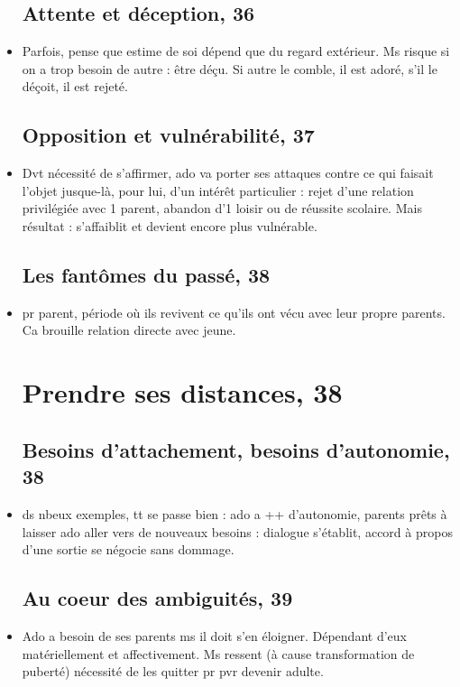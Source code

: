 \documentclass[12pt]{report}
\begin{document}
\begin{itemize}
\subsection{Attente et déception, 36}

\item Parfois, pense que estime de soi dépend que du regard extérieur. Ms risque si on a trop besoin de autre : être déçu. Si autre le comble, il est adoré, s'il le déçoit, il est rejeté.

\subsection{Opposition et vulnérabilité, 37}

\item Dvt nécessité de s'affirmer, ado va porter ses attaques contre ce qui faisait l'objet jusque-là, pour lui, d'un intérêt particulier : rejet d'une relation privilégiée avec 1 parent, abandon d'1 loisir ou de réussite scolaire. Mais résultat : s'affaiblit et devient encore plus vulnérable.

\subsection{Les fantômes du passé, 38}

\item pr parent, période où ils revivent ce qu'ils ont vécu avec leur propre parents. Ca brouille relation directe avec jeune.

\section{Prendre ses distances, 38}
\subsection{Besoins d'attachement, besoins d'autonomie, 38}

\item ds nbeux exemples, tt se passe bien : ado a ++ d'autonomie, parents prêts à laisser ado aller vers de nouveaux besoins : dialogue s'établit, accord à propos d'une sortie se négocie sans dommage.

\subsection{Au coeur des ambiguités, 39}

\item Ado a besoin de ses parents ms il doit s'en éloigner. Dépendant d'eux matériellement et affectivement. Ms ressent (à cause transformation de puberté) nécessité de les quitter pr pvr devenir adulte. \\


\end{itemize}
\end{document}
